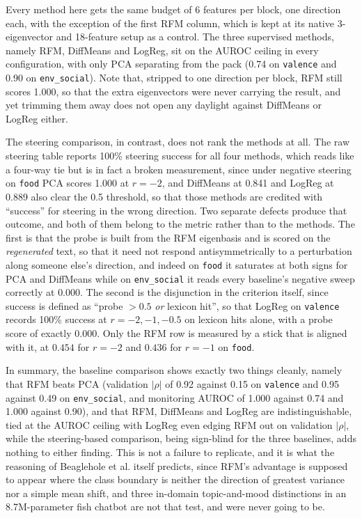 Every method here gets the same budget of 6 features per block, one direction each, with
the exception of the first RFM column, which is kept at its native 3-eigenvector and
18-feature setup as a control. The three supervised methods, namely RFM, DiffMeans and
LogReg, sit on the AUROC ceiling in every configuration, with only PCA separating from the
pack (0.74 on \verb|valence| and 0.90 on \verb|env_social|). Note that, stripped to one
direction per block, RFM still scores 1.000, so that the extra eigenvectors were never
carrying the result, and yet trimming them away does not open any daylight against
DiffMeans or LogReg either.

The steering comparison, in contrast, does not rank the methods at all. The raw
steering table reports 100\% steering success for all four methods, which reads like a
four-way tie but is in fact a broken measurement, since under negative steering on
\verb|food| PCA scores 1.000 at $r = -2$, and DiffMeans at 0.841 and LogReg at 0.889 also
clear the 0.5 threshold, so that those methods are credited with ``success'' for steering
in the wrong direction. Two separate defects produce that outcome, and both of them belong
to the metric rather than to the methods. The first is that the probe is built from the
RFM eigenbasis and is scored on the \emph{regenerated} text, so that it need not respond
antisymmetrically to a perturbation along someone else's direction, and indeed on
\verb|food| it saturates at both signs for PCA and DiffMeans while on \verb|env_social| it
reads every baseline's negative sweep correctly at $0.000$. The second is the disjunction
in the criterion itself, since success is defined as ``probe $>0.5$ \emph{or} lexicon
hit'', so that LogReg on \verb|valence| records 100\% success at $r = -2, -1, -0.5$ on
lexicon hits alone, with a probe score of exactly $0.000$. Only the RFM row is measured by
a stick that is aligned with it, at $0.454$ for $r = -2$ and $0.436$ for $r = -1$ on
\verb|food|.

In summary, the baseline comparison shows exactly two things cleanly, namely that RFM
beats PCA (validation $|\rho|$ of 0.92 against 0.15 on \verb|valence| and 0.95 against
0.49 on \verb|env_social|, and monitoring AUROC of 1.000 against 0.74 and 1.000 against
0.90), and that RFM, DiffMeans and LogReg are indistinguishable, tied at the AUROC ceiling
with LogReg even edging RFM out on validation $|\rho|$, while the steering-based
comparison, being sign-blind for the three baselines, adds nothing to either finding. This
is not a failure to replicate, and it is what the reasoning of Beaglehole et al. itself
predicts, since RFM's advantage is supposed to appear where the class boundary is neither
the direction of greatest variance nor a simple mean shift, and three in-domain
topic-and-mood distinctions in an 8.7M-parameter fish chatbot are not that test, and were
never going to be.

